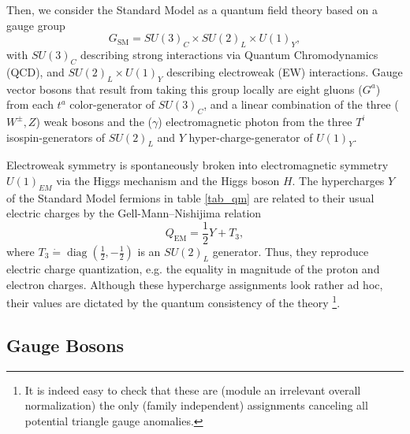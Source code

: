 Then, we consider the Standard Model as a quantum field theory based on a gauge group
\begin{equation}
	G_{\mathrm{SM}}=S U(3)_C \times S U(2)_{L} \times U(1)_{Y},
\end{equation}
with $S U(3)_C$ describing strong interactions via Quantum Chromodynamics (QCD), and $S U(2)_{L} \times U(1)_{Y}$ describing electroweak (EW) interactions. Gauge vector bosons that result from taking this group locally are eight gluons ($G^a$) from each $t^a$ color-generator of $SU(3)_C$, and a linear combination of the three ($W^\pm, Z$) weak bosons and the ($\gamma$) electromagnetic photon from the three $T^i$ isospin-generators of $SU(2)_L$ and $Y$ hyper-charge-generator of $U(1)_Y$.

Electroweak symmetry is spontaneously broken into electromagnetic symmetry $U(1)_{EM}$ via the Higgs mechanism and the Higgs boson $H$. The hypercharges $Y$ of the Standard Model fermions in table \ref{tab_qm} are related to their usual electric charges by the Gell-Mann–Nishijima relation~\parencite{10.1143/PTP.10.581} 
\begin{equation}
	Q_{\mathrm{EM}}=\frac12Y+T_{3}, \label{eq:Gell-Mann-Nishijima}
\end{equation}
where $T_{3}\dot=\operatorname{diag}\left(\frac{1}{2},-\frac{1}{2}\right)$ is an $S U(2)_{L}$ generator.  Thus, they reproduce electric charge quantization, e.g. the equality in magnitude of the proton and electron charges. Although these hypercharge assignments look rather ad hoc, their values are dictated by the quantum consistency of the theory \footnote{It is indeed easy to check that these are (module an irrelevant overall normalization) the only (family independent) assignments canceling all potential triangle gauge anomalies.}. 

\subsection{Gauge Bosons}

